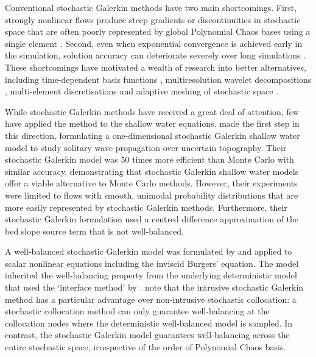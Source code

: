 Conventional stochastic Galerkin methods have two main shortcomings.
First, strongly nonlinear flows produce steep gradients or discontinuities in stochastic space that are often poorly represented by global Polynomial Chaos bases using a single element \citep{pettersson2014}.
Second, even when exponential convergence is achieved early in the simulation, solution accuracy can deteriorate severely over long simulations \citep{gerritsma2010}.
These shortcomings have motivated a wealth of research into better alternatives, including time-dependent basis functions \citep{gerritsma2010}, multiresolution wavelet decompositions \citep{lemaitre2004a}, multi-element discretisations and adaptive meshing of stochastic space \citep{wan-karniadakis2006,tryoen2010a,pettersson2014,li-stinis2015}.

While stochastic Galerkin methods have received a great deal of attention, few have applied the method to the shallow water equations.
\citet{ge2008} made the first step in this direction, formulating a one-dimensional stochastic Galerkin shallow water model to study solitary wave propagation over uncertain topography.
Their stochastic Galerkin model was 50 times more efficient than Monte Carlo with similar accuracy, demonstrating that stochastic Galerkin shallow water models offer a viable alternative to Monte Carlo methods.
However, their experiments were limited to flows with smooth, unimodal probability distributions that are more easily represented by stochastic Galerkin methods.
Furthermore, their stochastic Galerkin formulation used a centred difference approximation of the bed slope source term that is not well-balanced.

A well-balanced stochastic Galerkin model was formulated by \citet{jin2016} and applied to scalar nonlinear equations including the inviscid Burgers' equation.
The model inherited the well-balancing property from the underlying deterministic model that used the `interface method' by \citet{jin2001}.
\citet{jin2016} note that the intrusive stochastic Galerkin method has a particular advantage over non-intrusive stochastic collocation:
a stochastic collocation method can only guarantee well-balancing at the collocation nodes where the deterministic well-balanced model is sampled.
In contrast, the stochastic Galerkin model guarantees well-balancing across the entire stochastic space, irrespective of the order of Polynomial Chaos basis.

